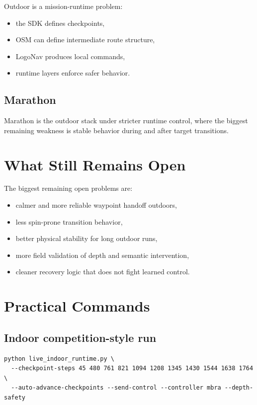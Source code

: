 \documentclass[11pt]{article}
\begin{document}
Outdoor is a mission-runtime problem:

\begin{itemize}[nosep]
  \item the SDK defines checkpoints,
  \item OSM can define intermediate route structure,
  \item LogoNav produces local commands,
  \item runtime layers enforce safer behavior.
\end{itemize}

\subsection{Marathon}

Marathon is the outdoor stack under stricter runtime control, where the biggest
remaining weakness is stable behavior during and after target transitions.

\section{What Still Remains Open}

The biggest remaining open problems are:

\begin{itemize}[nosep]
  \item calmer and more reliable waypoint handoff outdoors,
  \item less spin-prone transition behavior,
  \item better physical stability for long outdoor runs,
  \item more field validation of depth and semantic intervention,
  \item cleaner recovery logic that does not fight learned control.
\end{itemize}

\section{Practical Commands}

\subsection{Indoor competition-style run}

\begin{verbatim}
python live_indoor_runtime.py \
  --checkpoint-steps 45 480 761 821 1094 1208 1345 1430 1544 1638 1764 \
  --auto-advance-checkpoints --send-control --controller mbra --depth-safety
\end{verbatim}
\end{document}
